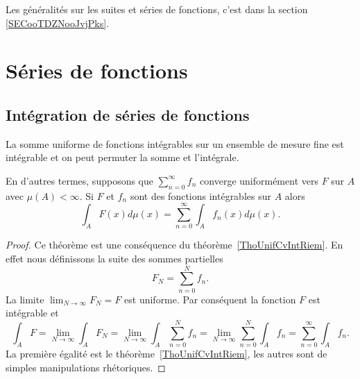 
Les généralités sur les suites et séries de fonctions, c'est dans la section \ref{SECooTDZNooJvjPks}.

\section{Séries de fonctions}

\subsection{Intégration de séries de fonctions}

\begin{theorem}      \label{ThoCciOlZ}
	La somme uniforme de fonctions intégrables sur un ensemble de mesure fine est intégrable et on peut permuter la somme et l'intégrale.

	En d'autres termes, supposons que \( \sum_{n=0}^{\infty}f_n\) converge uniformément vers \( F\) sur \( A\) avec \( \mu(A)<\infty\). Si \( F\) et \( f_n\) sont des fonctions intégrables sur \( A\) alors
	\begin{equation}
		\int_AF(x)d\mu(x)=\sum_{n=0}^{\infty}\int_Af_n(x)d\mu(x).
	\end{equation}
\end{theorem}

\begin{proof}
	Ce théorème est une conséquence du théorème~\ref{ThoUnifCvIntRiem}. En effet nous définissons la suite des sommes partielles
	\begin{equation}
		F_N=\sum_{n=0}^Nf_n.
	\end{equation}
	La limite \( \lim_{N\to \infty} F_N=F\) est uniforme. Par conséquent la fonction \( F\) est intégrable et
	\begin{equation}
		\int_A F=\lim_{N\to \infty} \int_AF_N=\lim_{N\to \infty} \int_A\sum_{n=0}^Nf_n=\lim_{N\to \infty} \sum_{n=0}^N\int_Af_n=\sum_{n=0}^{\infty}\int_Af_n.
	\end{equation}
	La première égalité est le théorème~\ref{ThoUnifCvIntRiem}, les autres sont de simples manipulations rhétoriques.
\end{proof}

